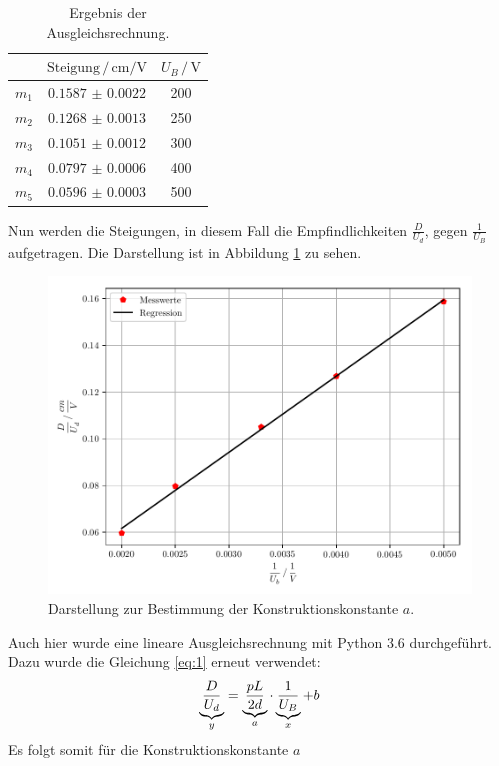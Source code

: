 \begin{table}[H]
  \centering
  \caption{Ergebnis der Ausgleichsrechnung.}
  \label{tab:2}
  \begin{tabular}{c c c}
\toprule
&$\text{Steigung} \,/\, \si{\centi\meter\per\volt}$& $U_B \, /\, \si{\volt}$\\
\midrule
$m_1$ & $\num{0.1587(22)}$& 200\\
$m_2$ & $\num{0.1268(13)}$& 250\\
$m_3$ & $\num{0.1051(12)}$& 300\\
$m_4$ & $\num{0.0797(6)}$ & 400\\
$m_5$ & $\num{0.0596(3)}$ & 500\\
\bottomrule
  \end{tabular}
\end{table}
Nun werden die Steigungen, in diesem Fall die Empfindlichkeiten $\frac{D}{U_d}$, gegen $\frac{1}{U_B}$ aufgetragen.
Die Darstellung ist in Abbildung \ref{abb:7} zu sehen.
\begin{figure}[H]
  \centering
  \includegraphics[width=\textwidth]{plot2.pdf}
  \caption{Darstellung zur Bestimmung der Konstruktionskonstante $a$.}
  \label{abb:7}
\end{figure}
Auch hier wurde eine lineare Ausgleichsrechnung mit Python 3.6 durchgeführt.
Dazu wurde die Gleichung \ref{eq:1} erneut verwendet:
\begin{equation*}
  \underbrace{\frac{D}{U_d}}_{\mathclap{y}} = \underbrace{\frac{pL}{2d}}_{\mathclap{a}} \cdot \underbrace{\frac{1}{U_B}}_{\mathclap{x}} + b
\end{equation*}
Es folgt somit für die Konstruktionskonstante $a$
